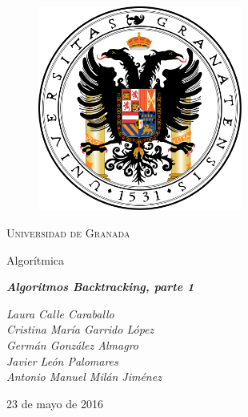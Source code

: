 \documentclass[11pt,a4paper]{article}
\begin{document}
	\begin{titlepage}

		\centering

		\begin{figure}[h]

			\centering
			\includegraphics[width=0.6\textwidth]{logo-ugr.png}
			
		\end{figure}

		\vspace{1cm}

		{\scshape\LARGE Universidad de Granada}

		\vspace{1cm}

		{\LARGE Algorítmica}

		\vspace{1cm}

		{\huge\bfseries\textit{Algoritmos Backtracking, parte 1}}

		\vspace{1cm}

		{\itshape\large 
		Laura Calle Caraballo \\
		Cristina María Garrido López \\
		Germán González Almagro \\
		Javier León Palomares \\
		Antonio Manuel Milán Jiménez}

		\vfill

		{\Large23 de mayo de 2016}

	\end{titlepage}

\newpage

	\tableofcontents

\newpage
\end{document}
